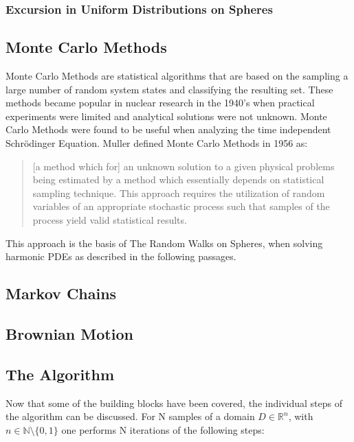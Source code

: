   \subsubsection{Excursion in Uniform Distributions on Spheres}

\subsection{Monte Carlo Methods}\label{sssec:montecarlo}
Monte Carlo Methods are statistical algorithms that are based on the sampling a
large number of random system states and classifying the resulting set\cite{Metropolis}.
These methods became popular in nuclear research in the 1940's when practical
experiments were limited and analytical solutions were not unknown.  Monte Carlo
Methods were found to be useful when analyzing the time independent Schrödinger
Equation\cite{Metropolis}. Muller defined
Monte Carlo Methods in 1956 as: \begin{quote}[a method which for] an unknown solution to a given physical
problems being estimated by a method which essentially depends on statistical sampling technique.
This approach requires the utilization of random variables of an appropriate
stochastic process such that samples of the process yield valid statistical results\cite{Muller}.\end{quote}
This approach is the basis of The Random Walks on Spheres, when solving harmonic \Glspl{PDE} as described in the
following passages.


\subsection{Markov Chains}\label{sssec:markov}
\subsection{Brownian Motion}\label{sssec:brownian}


\subsection{The Algorithm}\label{sssec:algorithm}
Now that some of the building blocks have been covered, the individual steps of
the algorithm can be discussed.  For N samples of a
domain $D \in \mathbb{R}^{n}$, with $n \in \mathbb{N}\setminus \{0,1\}$
one performs N iterations of the following steps:

